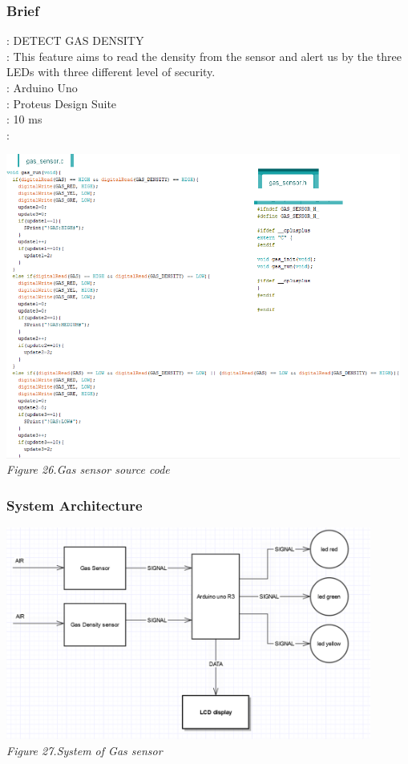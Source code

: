 \documentclass[a4paper]{article}
\begin{document}
\subsubsection{Brief}
\text{[TOPIC]}: DETECT GAS DENSITY\\
\text{[Description]}: This feature aims to read the density from the sensor and alert us by the three LEDs with three different level of security.\\
\text{[Board]}: Arduino Uno\\
\text{[Simulation]}: Proteus Design Suite\\
: 10 ms\\
:
\medskip
\begin{center}
    \includegraphics[width=13cm]{pictures/Gas_sensor.png}\\
    \textit{Figure 26.Gas sensor source code}\\
\end{center}
\subsubsection{System Architecture}
\medskip
\begin{center}
    \includegraphics[width=12cm]{pictures/SA_gas.png}\\
    \textit{Figure 27.System of Gas sensor}\\
\end{center}
\medskip
\end{document}
